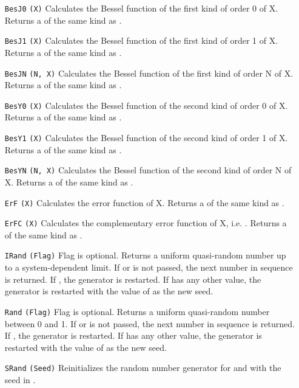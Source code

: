 \begin{itemize}
  \item[\tt BesJ0]{\tt (X)}
    Calculates the Bessel function of the first kind of order 0 of X.
    Returns a  of the same kind as .
  \item[\tt BesJ1]{\tt (X)}
    Calculates the Bessel function of the first kind of order 1 of X.
    Returns a  of the same kind as .
  \item[\tt BesJN]{\tt (N, X)}
    Calculates the Bessel function of the first kind of order N of X.
    Returns a  of the same kind as .
  \item[\tt BesY0]{\tt (X)}
    Calculates the Bessel function of the second kind of order 0 of X.
    Returns a  of the same kind as .
  \item[\tt BesY1]{\tt (X)}
    Calculates the Bessel function of the second kind of order 1 of X.
    Returns a  of the same kind as .
  \item[\tt BesYN]{\tt (N, X)}
    Calculates the Bessel function of the second kind of order N of X.
    Returns a  of the same kind as .
  \item[\tt ErF]{\tt (X)}
    Calculates the error function of X.
    Returns a  of the same kind as .
  \item[\tt ErFC]{\tt (X)}
    Calculates the complementary error function of X, i.e. .
    Returns a  of the same kind as .
  \item[\tt IRand]{\tt (Flag)}
    Flag is optional.
    Returns a uniform quasi-random number up to a system-dependent limit.
    If  or  is not passed, the next number
    in sequence is returned.
    If , the generator is restarted.
    If  has any other value, the generator is restarted with
    the value of  as the new seed.
  \item[\tt Rand]{\tt (Flag)}
    Flag is optional.
    Returns a uniform quasi-random number between 0 and 1.
    If  or  is not passed, the next number
    in sequence is returned.
    If , the generator is restarted.
    If  has any other value, the generator is restarted with
    the value of  as the new seed.
  \item[\tt SRand]{\tt (Seed)}
    Reinitializes the random number generator for  and 
    with the seed in .
\end{itemize}

